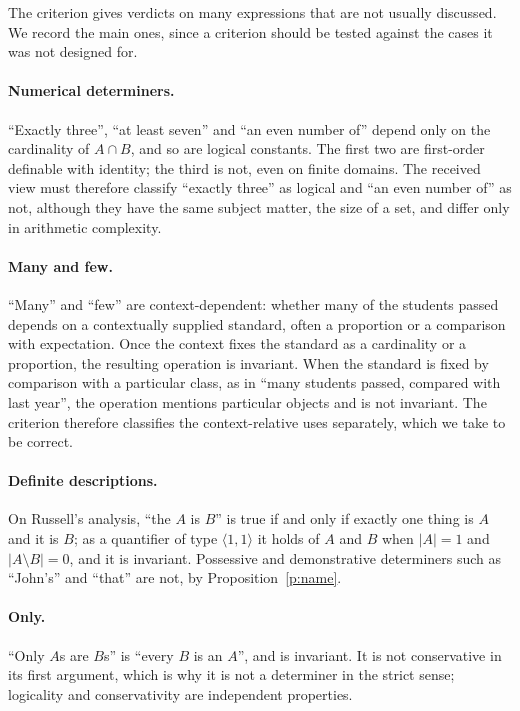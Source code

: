 \documentclass{situationist-preprint}
\begin{document}
The criterion gives verdicts on many expressions that are not usually discussed. We record the main ones, since a criterion should be tested against the cases it was not designed for.

\paragraph{Numerical determiners.} \enquote{Exactly three}, \enquote{at least seven} and \enquote{an even number of} depend only on the cardinality of $A \cap B$, and so are logical constants. The first two are first-order definable with identity; the third is not, even on finite domains. The received view must therefore classify \enquote{exactly three} as logical and \enquote{an even number of} as not, although they have the same subject matter, the size of a set, and differ only in arithmetic complexity.

\paragraph{Many and few.} \enquote{Many} and \enquote{few} are context-dependent: whether many of the students passed depends on a contextually supplied standard, often a proportion or a comparison with expectation. Once the context fixes the standard as a cardinality or a proportion, the resulting operation is invariant. When the standard is fixed by comparison with a particular class, as in \enquote{many students passed, compared with last year}, the operation mentions particular objects and is not invariant. The criterion therefore classifies the context-relative uses separately, which we take to be correct.

\paragraph{Definite descriptions.} On Russell's analysis, \enquote{the $A$ is $B$} is true if and only if exactly one thing is $A$ and it is $B$; as a quantifier of type $\langle 1, 1\rangle$ it holds of $A$ and $B$ when $|A| = 1$ and $|A \setminus B| = 0$, and it is invariant. Possessive and demonstrative determiners such as \enquote{John's} and \enquote{that} are not, by Proposition~\ref{p:name}.

\paragraph{Only.} \enquote{Only $A$s are $B$s} is \enquote{every $B$ is an $A$}, and is invariant. It is not conservative in its first argument, which is why it is not a determiner in the strict sense; logicality and conservativity are independent properties.
\end{document}
